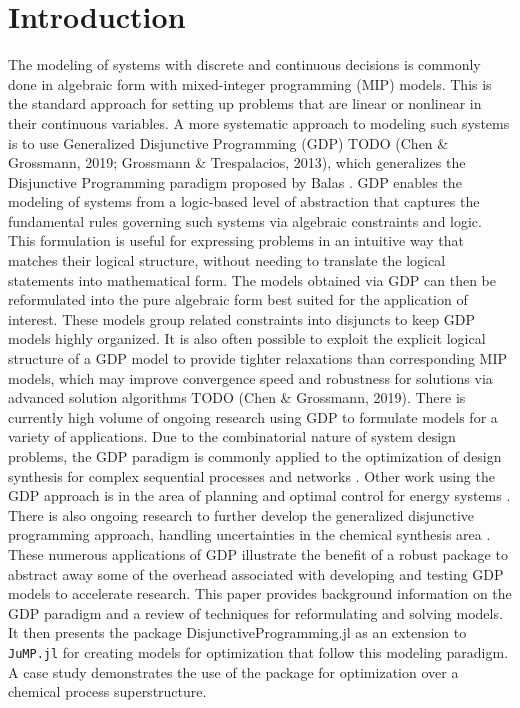 \documentclass{juliacon}
\begin{document}
\section{Introduction}
The modeling of systems with discrete and continuous decisions is commonly done in algebraic form with mixed-integer programming (MIP) models. This is the standard approach for setting up problems that are linear or nonlinear in their continuous variables.
\vskip 6pt
A more systematic approach to modeling such systems is to use Generalized Disjunctive Programming (GDP) TODO (Chen \& Grossmann, 2019; Grossmann \& Trespalacios, 2013), which generalizes the Disjunctive Programming paradigm proposed by Balas \cite{balas_2018}. GDP enables the modeling of systems from a logic-based level of abstraction that captures the fundamental rules governing such systems via algebraic constraints and logic. This formulation is useful for expressing problems in an intuitive way that matches their logical structure, without needing to translate the logical statements into mathematical form. 
\vskip 6pt
The models obtained via GDP can then be reformulated into the pure algebraic form best suited for the application of interest. These models group related constraints into disjuncts to keep GDP models highly organized. It is also often possible to exploit the explicit logical structure of a GDP model to provide tighter relaxations than corresponding MIP models, which may improve convergence speed and robustness for solutions via advanced solution algorithms TODO (Chen \& Grossmann, 2019).
\vskip 6pt
There is currently high volume of ongoing research using GDP to formulate models for a variety of applications. Due to the combinatorial nature of system design problems, the GDP paradigm is commonly applied to the optimization of design synthesis for complex sequential processes and networks \cite{MATOVU2022107856, ZHOU202269}. Other work using the GDP approach is in the area of planning and optimal control for energy systems \cite{CHO2022841, kim2022generalized}. There is also ongoing research to further develop the generalized disjunctive programming approach, handling uncertainties in the chemical synthesis area \cite{CHEN2022107616}. These numerous applications of GDP illustrate the benefit of a robust package to abstract away some of the overhead associated with developing and testing GDP models to accelerate research.
\vskip 6pt
This paper provides background information on the GDP paradigm and a review of techniques for reformulating and solving models. It then presents the package DisjunctiveProgramming.jl as an extension to \verb|JuMP.jl| for creating models for optimization that follow this modeling paradigm. A case study demonstrates the use of the package for optimization over a chemical process superstructure.
\end{document}
